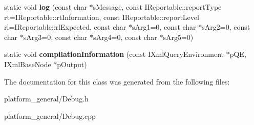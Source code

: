 \begin{DoxyCompactItemize}
\item 
\hypertarget{classgeneral__server_1_1Debug_a23a705410a86baa26e542685b7843f62}{static void {\bfseries log} (const char $\ast$s\-Message, const \-I\-Reportable\-::report\-Type rt=\-I\-Reportable\-::rt\-Information, const \-I\-Reportable\-::report\-Level rl=\-I\-Reportable\-::rl\-Expected, const char $\ast$s\-Arg1=0, const char $\ast$s\-Arg2=0, const char $\ast$s\-Arg3=0, const char $\ast$s\-Arg4=0, const char $\ast$s\-Arg5=0)}\label{classgeneral__server_1_1Debug_a23a705410a86baa26e542685b7843f62}

\item 
\hypertarget{classgeneral__server_1_1Debug_a9814207e7273e05a33a04e3358835457}{static void {\bfseries compilation\-Information} (const \-I\-Xml\-Query\-Environment $\ast$p\-Q\-E, \-I\-Xml\-Base\-Node $\ast$p\-Output)}\label{classgeneral__server_1_1Debug_a9814207e7273e05a33a04e3358835457}

\end{DoxyCompactItemize}


\-The documentation for this class was generated from the following files\-:\begin{DoxyCompactItemize}
\item 
platform\-\_\-general/\-Debug.\-h\item 
platform\-\_\-general/\-Debug.\-cpp\end{DoxyCompactItemize}
